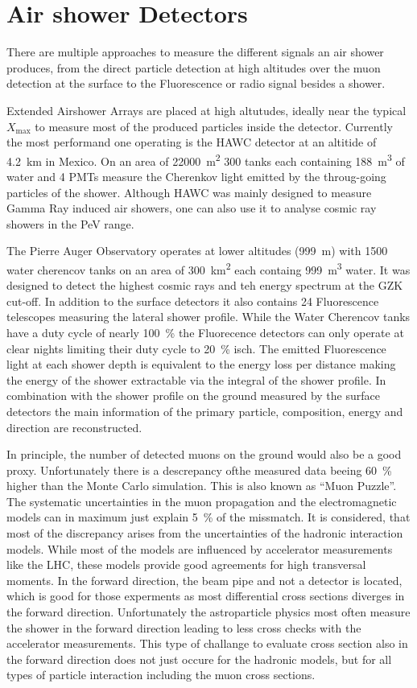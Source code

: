 \section{Air shower Detectors}

There are multiple approaches to measure the different signals an air shower produces, from the direct particle detection at high altitudes over the muon detection at the surface to the Fluorescence or radio signal besides a shower.

Extended Airshower Arrays are placed at high altutudes, ideally near the typical $X_{\mathrm{max}}$ to measure most of the produced particles inside the detector.
Currently the most performand one operating is the HAWC detector at an altitide of \SI{4.2}{km} in Mexico.
On an area of \SI{22000}{\square\meter} 300 tanks each containing \SI{188}{\cubic\meter} of water and 4 PMTs measure the Cherenkov light emitted by the throug-going particles of the shower.
Although HAWC was mainly designed to measure Gamma Ray induced air showers, one can also use it to analyse cosmic ray showers in the PeV range.

The Pierre Auger Observatory operates at lower altitudes (\SI{999}{m}) with 1500 water cherencov tanks on an area of \SI{300}{\square\kilo\meter} each containg \SI{999}{\cubic\meter} water.
It was designed to detect the highest cosmic rays and teh energy spectrum at the GZK cut-off.
In addition to the surface detectors it also contains 24 Fluorescence telescopes measuring the lateral shower profile.
While the Water Cherencov tanks have a duty cycle of nearly \SI{100}{\percent} the Fluorecence detectors can only operate at clear nights limiting their duty cycle to \SI{20}{\percent} isch.
The emitted Fluorescence light at each shower depth is equivalent to the energy loss per distance making the energy of the shower extractable via the integral of the shower profile.
In combination with the shower profile on the ground measured by the surface detectors the main information of the primary particle, composition, energy and direction are reconstructed.

In principle, the number of detected muons on the ground would also be a good proxy.
Unfortunately there is a descrepancy ofthe measured data beeing \SI{60}{\percent} higher than the Monte Carlo simulation.
This is also known as \enquote{Muon Puzzle}.
The systematic uncertainties in the muon propagation and the electromagnetic models can in maximum just explain \SI{5}{\percent} of the missmatch.
It is considered, that most of the discrepancy arises from the uncertainties of the hadronic interaction models.
While most of the models are influenced by accelerator measurements like the LHC, these models provide good agreements for high transversal moments.
In the forward direction, the beam pipe and not a detector is located, which is good for those experments as most differential cross sections diverges in the forward direction.
Unfortunately the astroparticle physics most often measure the shower in the forward direction leading to less cross checks with the accelerator measurements.
This type of challange to evaluate cross section also in the forward direction does not just occure for the hadronic models, but for all types of particle interaction including the muon cross sections.

